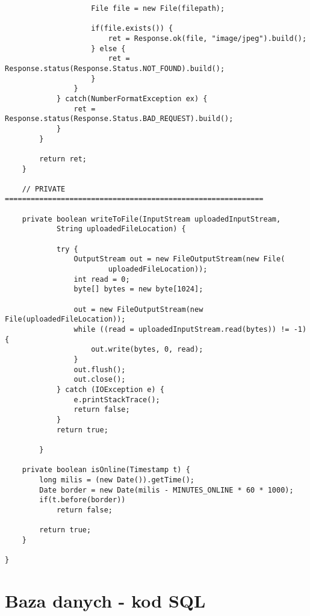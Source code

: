 \begin{lstlisting}
					File file = new File(filepath);
					
					if(file.exists()) {
						ret = Response.ok(file, "image/jpeg").build();
					} else {
						ret = Response.status(Response.Status.NOT_FOUND).build();
					}
				} 
			} catch(NumberFormatException ex) {
				ret = Response.status(Response.Status.BAD_REQUEST).build();
			}
		}
		
		return ret;
	}
	
	// PRIVATE  ============================================================
	
	private boolean writeToFile(InputStream uploadedInputStream,
			String uploadedFileLocation) {
	 
			try {
				OutputStream out = new FileOutputStream(new File(
						uploadedFileLocation));
				int read = 0;
				byte[] bytes = new byte[1024];
	 
				out = new FileOutputStream(new File(uploadedFileLocation));
				while ((read = uploadedInputStream.read(bytes)) != -1) {
					out.write(bytes, 0, read);
				}
				out.flush();
				out.close();
			} catch (IOException e) {
				e.printStackTrace();
				return false;
			}
			return true;
	 
		}
	
	private boolean isOnline(Timestamp t) {
		long milis = (new Date()).getTime();
		Date border = new Date(milis - MINUTES_ONLINE * 60 * 1000);
		if(t.before(border))
			return false;
		
		return true;
	}
	
}
\end{lstlisting}


\section{Baza danych - kod SQL}
\label{sec:dbsql}

	\lstset{
		language=SQL}
		
